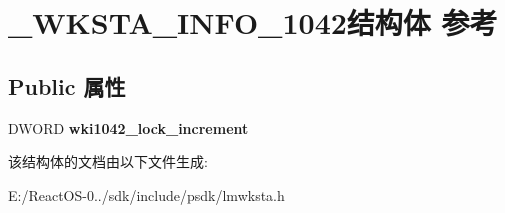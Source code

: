 \hypertarget{struct___w_k_s_t_a___i_n_f_o__1042}{}\section{\+\_\+\+W\+K\+S\+T\+A\+\_\+\+I\+N\+F\+O\+\_\+1042结构体 参考}
\label{struct___w_k_s_t_a___i_n_f_o__1042}
\subsection*{Public 属性}
\begin{DoxyCompactItemize}
\item 
\mbox{\label{struct___w_k_s_t_a___i_n_f_o__1042_a5bcc76d8136e92e2d361b0f5bb3fe42e}} 
D\+W\+O\+RD {\bfseries wki1042\+\_\+lock\+\_\+increment}
\end{DoxyCompactItemize}


该结构体的文档由以下文件生成\+:\begin{DoxyCompactItemize}
\item 
E\+:/\+React\+O\+S-\/0../sdk/include/psdk/lmwksta.\+h\end{DoxyCompactItemize}
